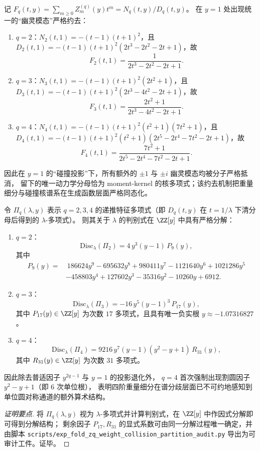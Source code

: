 \begin{remark}[\texorpdfstring{$y=1$}{y=1} 的幽灵模态全消与 moment-kernel 的严格同态化]\label{rem:xi-terminal-zq-ghost-cancellation-y1}
记 \(F_q(t,y)=\sum_{m\ge 0}Z_m^{(q)}(y)t^m=N_q(t,y)/D_q(t,y)\)。
在 \(y=1\) 处出现统一的“幽灵模态”严格约去：
\begin{enumerate}
  \item \(q=2\)：\(N_2(t,1)=-(t-1)(t+1)^2\)，且 \(D_2(t,1)=-(t-1)(t+1)^2(2t^3-2t^2-2t+1)\)，故
  \[
  F_2(t,1)=\frac{1}{2t^3-2t^2-2t+1}.
  \]
  \item \(q=3\)：\(N_3(t,1)=-(t-1)(t+1)^2(2t^2+1)\)，且 \(D_3(t,1)=-(t-1)(t+1)^2(2t^3-4t^2-2t+1)\)，故
  \[
  F_3(t,1)=\frac{2t^2+1}{2t^3-4t^2-2t+1}.
  \]
  \item \(q=4\)：\(N_4(t,1)=-(t-1)(t+1)^2(t^2+1)(7t^2+1)\)，且
  \(D_4(t,1)=-(t-1)(t+1)^2(t^2+1)(2t^5-2t^4-7t^2-2t+1)\)，故
  \[
  F_4(t,1)=\frac{7t^2+1}{2t^5-2t^4-7t^2-2t+1}.
  \]
\end{enumerate}
因此在 \(y=1\) 的“碰撞投影”下，所有额外的 \(\pm1\) 与 \(\pm i\) 幽灵模态均被分子严格抵消，
留下的唯一动力学分母恰为 moment-kernel 的核多项式；该约去机制把重量细分与碰撞核谱系在生成函数层面严格同态化。
\end{remark}

\begin{conclusion}\label{con:xi-terminal-zq-discriminant-factorization}
令 \(\Pi_q(\lambda,y)\) 表示 \(q=2,3,4\) 的递推特征多项式（即 \(D_q(t,y)\) 在 \(t=1/\lambda\) 下清分母后得到的 \(\lambda\)-多项式）。
则其关于 \(\lambda\) 的判别式在 \(\ZZ[y]\) 中具有严格分解：
\begin{enumerate}
  \item \(q=2\)：
  \[
  \mathrm{Disc}_{\lambda}(\Pi_2)=4\,y^{3}(y-1)\,P_{9}(y),
  \]
  其中
  \[
  \begin{aligned}
  P_{9}(y)=&\ 186624y^9-695632y^8+980411y^7-1121640y^6+1021286y^5\\
  &-458803y^4+127602y^3-35316y^2-10260y+6912.
  \end{aligned}
  \]
  \item \(q=3\)：
  \[
  \mathrm{Disc}_{\lambda}(\Pi_3)=-16\,y^{5}(y-1)^3\,P_{17}(y),
  \]
  其中 \(P_{17}(y)\in\ZZ[y]\) 为次数 \(17\) 多项式，且具有唯一负实根 \(y\approx-1.07316827\)。
  \item \(q=4\)：
  \[
  \mathrm{Disc}_{\lambda}(\Pi_4)=9216\,y^{7}(y-1)(y^2-y+1)\,R_{31}(y),
  \]
  其中 \(R_{31}(y)\in\ZZ[y]\) 为次数 \(31\) 多项式。
\end{enumerate}
因此除去普适因子 \(y^{2q-1}\) 与 \(y=1\) 的投影退化外，
\(q=4\) 首次强制出现割圆因子 \(y^2-y+1\)（即 \(6\) 次单位根），
表明四阶重量细分在谱分歧层面已不可约地感知到单位圆对称通道的额外算术结构。
\end{conclusion}
\begin{proof}[证明要点]
将 \(\Pi_q(\lambda,y)\) 视为 \(\lambda\)-多项式并计算判别式，在 \(\ZZ[y]\) 中作因式分解即可得到分解结构；
剩余因子 \(P_{17},R_{31}\) 的显式系数可由同一分解过程唯一确定，并由脚本
\texttt{scripts/exp\_fold\_zq\_weight\_collision\_partition\_audit.py} 导出为可审计工件。证毕。
\end{proof}

